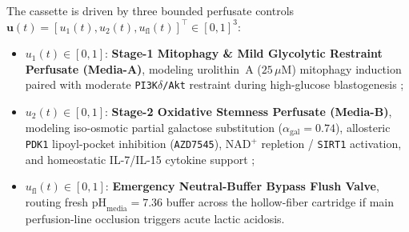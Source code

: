 \documentclass[11pt]{article}
\theoremstyle{plain}
\theoremstyle{remark}
\begin{document}
The cassette is driven by three bounded perfusate controls $\mathbf{u}(t) = [u_1(t), u_2(t), u_{\mathrm{fl}}(t)]^\top \in [0, 1]^3$:
\begin{itemize}
  \item $u_1(t) \in [0, 1]$: \textbf{Stage-1 Mitophagy \& Mild Glycolytic Restraint Perfusate (Media-A)}, modeling urolithin~A ($25\,\mu\mathrm{M}$) mitophagy induction paired with moderate \texttt{PI3K$\delta$/Akt} restraint during high-glucose blastogenesis \cite{denk2022immunity,chan2024foxo1};
  \item $u_2(t) \in [0, 1]$: \textbf{Stage-2 Oxidative Stemness Perfusate (Media-B)}, modeling iso-osmotic partial galactose substitution ($\alpha_{\mathrm{gal}} = 0.74$), allosteric \texttt{PDK1} lipoyl-pocket inhibition (\texttt{AZD7545}), $\text{NAD}^+$ repletion / \texttt{SIRT1} activation, and homeostatic IL-7/IL-15 cytokine support \cite{kato2007pdk1,dai2015sirt1};
  \item $u_{\mathrm{fl}}(t) \in [0, 1]$: \textbf{Emergency Neutral-Buffer Bypass Flush Valve}, routing fresh $\mathrm{pH}_{\mathrm{media}} = 7.36$ buffer across the hollow-fiber cartridge if main perfusion-line occlusion triggers acute lactic acidosis.
\end{itemize}
\end{document}
